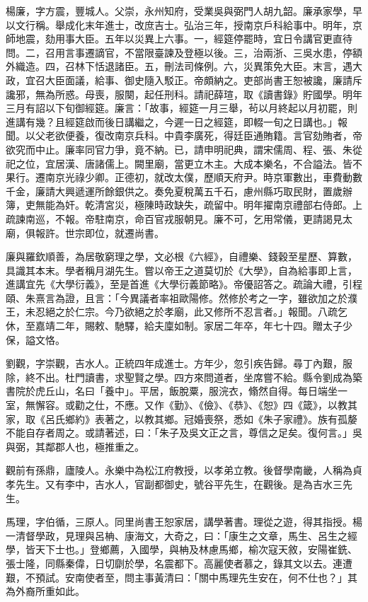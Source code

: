 \begin{pinyinscope}
楊廉，字方震，豐城人。父崇，永州知府，受業吳與弼門人胡九韶。廉承家學，早以文行稱。舉成化末年進士，改庶吉士。弘治三年，授南京戶科給事中。明年，京師地震，劾用事大臣。五年以災異上六事。一，經筵停罷時，宜日令講官更直待問。二，召用言事遷謫官，不當限臺諫及登極以後。三，治兩浙、三吳水患，停額外織造。四，召林下恬退諸臣。五，刪法司條例。六，災異策免大臣。末言，遇大政，宜召大臣面議，給事、御史隨入駁正。帝頗納之。吏部尚書王恕被讒，廉請斥讒邪，無為所惑。母喪，服闋，起任刑科。請祀薛瑄，取《讀書錄》貯國學。明年三月有詔以下旬御經筵。廉言：「故事，經筵一月三舉，茍以月終起以月初罷，則進講有幾？且經筵啟而後日講繼之，今遲一日之經筵，即輟一旬之日講也。」報聞。以父老欲便養，復改南京兵科。中貴李廣死，得廷臣通賄籍。言官劾賄者，帝欲究而中止。廉率同官力爭，竟不納。已，請申明祀典，謂宋儒周、程、張、朱從祀之位，宜居漢、唐諸儒上。闕里廟，當更立木主。大成本樂名，不合謚法。皆不果行。遷南京光祿少卿。正德初，就改太僕，歷順天府尹。時京軍數出，車費動數千金，廉請大興遞運所餘銀供之。奏免夏稅萬五千石，慮州縣巧取民財，置歲辦簿，吏無能為奸。乾清宮災，極陳時政缺失，疏留中。明年擢南京禮部右侍郎。上疏諫南巡，不報。帝駐南京，命百官戎服朝見。廉不可，乞用常儀，更請謁見太廟，俱報許。世宗即位，就遷尚書。

廉與羅欽順善，為居敬窮理之學，文必根《六經》，自禮樂、錢穀至星歷、算數，具識其本末。學者稱月湖先生。嘗以帝王之道莫切於《大學》，自為給事即上言，進講宜先《大學衍義》，至是首進《大學衍義節略》。帝優詔答之。疏論大禮，引程頤、朱熹言為證，且言：「今異議者率祖歐陽修。然修於考之一字，雖欲加之於濮王，未忍絕之於仁宗。今乃欲絕之於孝廟，此又修所不忍言者。」報聞。八疏乞休，至嘉靖二年，賜敕、馳驛，給夫廩如制。家居二年卒，年七十四。贈太子少保，謚文恪。

劉觀，字崇觀，吉水人。正統四年成進士。方年少，忽引疾告歸。尋丁內艱，服除，終不出。杜門讀書，求聖賢之學。四方來問道者，坐席嘗不給。縣令劉成為築書院於虎丘山，名曰「養中」。平居，飯脫粟，服浣衣，翛然自得。每日端坐一室，無懈容。或勸之仕，不應。又作《勤》、《儉》、《恭》、《恕》四《箴》，以教其家，取《呂氏鄉約》表著之，以教其鄉。冠婚喪祭，悉如《朱子家禮》。族有孤嫠不能自存者周之。或請著述，曰：「朱子及吳文正之言，尊信之足矣。復何言。」吳與弼，其鄰郡人也，極推重之。

觀前有孫鼎，廬陵人。永樂中為松江府教授，以孝弟立教。後督學南畿，人稱為貞孝先生。又有李中，吉水人，官副都御史，號谷平先生，在觀後。是為吉水三先生。

馬理，字伯循，三原人。同里尚書王恕家居，講學著書。理從之遊，得其指授。楊一清督學政，見理與呂柟、康海文，大奇之，曰：「康生之文章，馬生、呂生之經學，皆天下士也。」登鄉薦，入國學，與柟及林慮馬鄉，榆次寇天敘，安陽崔銑、張士隆，同縣秦偉，日切劘於學，名震都下。高麗使者慕之，錄其文以去。連遭艱，不預試。安南使者至，問主事黃清曰：「關中馬理先生安在，何不仕也？」其為外裔所重如此。


\end{pinyinscope}
